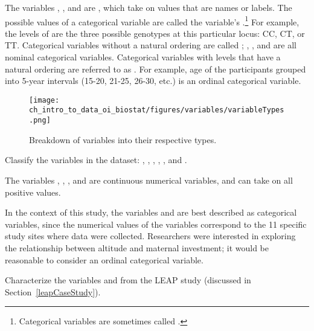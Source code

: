 \textD{\newpage}

The variables , , and  are , which take on values that are names or labels. The possible values of a categorical variable are called the variable's .\footnote{Categorical variables are sometimes called .}  For example, the levels of  are the three possible genotypes at this particular locus: CC, CT, or TT.  Categorical variables without a natural ordering are called ; , , and  are all nominal categorical variables. Categorical variables with levels that have a natural ordering are referred to as . For example, age of the participants grouped into 5-year intervals (15-20, 21-25, 26-30, etc.) is an ordinal categorical variable.  

\begin{figure}
\centering
\texttt{[image: ch\_intro\_to\_data\_oi\_biostat/figures/variables/variableTypes.png]}
\caption{Breakdown of variables into their respective types.}
\label{variableTypesFig}
\end{figure}

\begin{examplewrap}
\begin{nexample}{Classify the variables in the  dataset: , , , , , and .}

The variables , , , and  are continuous numerical variables, and can take on all positive values.

In the context of this study, the variables  and  are best described as categorical variables, since the numerical values of the variables correspond to the 11 specific study sites where data were collected. Researchers were interested in exploring the relationship between altitude and maternal investment; it would be reasonable to consider  an ordinal categorical variable.
\end{nexample}
\end{examplewrap}

\begin{exercisewrap}
\begin{nexercise} 
	Characterize the variables  and  from the LEAP study (discussed in Section~\ref{leapCaseStudy}).\footnotemark{}
\end{nexercise}
\end{exercisewrap}

